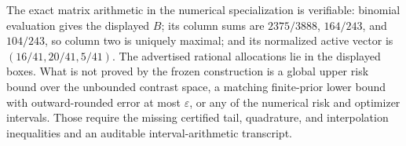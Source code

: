 The exact matrix arithmetic in the numerical specialization is verifiable: binomial evaluation gives the displayed \(B\); its column sums are \(2375/3888\), \(164/243\), and \(104/243\), so column two is uniquely maximal; and its normalized active vector is \((16/41,20/41,5/41)\).  The advertised rational allocations lie in the displayed boxes.  What is not proved by the frozen construction is a global upper risk bound over the unbounded contrast space, a matching finite-prior lower bound with outward-rounded error at most \(\varepsilon\), or any of the numerical risk and optimizer intervals.  Those require the missing certified tail, quadrature, and interpolation inequalities and an auditable interval-arithmetic transcript.